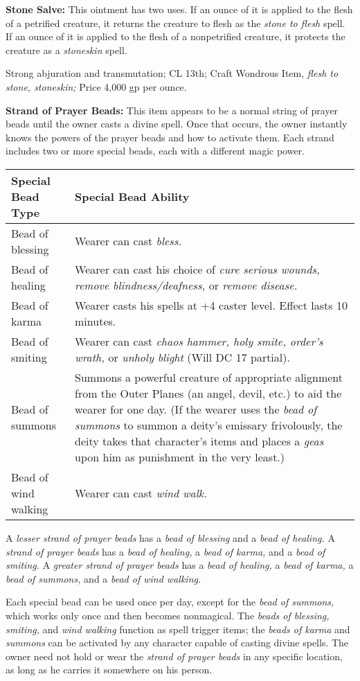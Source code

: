 \documentclass{article}
\begin{document}
\textbf{Stone Salve:} This ointment has two uses. If an ounce of it is applied 
to the flesh of a petrified creature, it returns the creature to flesh as the \textit{stone 
to flesh }spell. If an ounce of it is applied to the flesh of a nonpetrified creature, 
it protects the creature as a \textit{stoneskin }spell.

Strong abjuration and transmutation; CL 13th; Craft Wondrous Item, \textit{flesh 
to stone, stoneskin; }Price 4,000 gp per ounce.

\textbf{Strand of Prayer Beads:} This item appears to be a normal string of prayer 
beads until the owner casts a divine spell. Once that occurs, the owner instantly 
knows the powers of the prayer beads and how to activate them. Each strand includes 
two or more special beads, each with a different magic power.

\begin{tabular}{|>{\raggedright}p{62pt}|>{\raggedright}p{263pt}|}
\hline
S\textbf{pecial Bead Type} & S\textbf{pecial Bead Ability}\tabularnewline
\hline
Bead of blessing & Wearer can cast \textit{bless.}\tabularnewline
\hline
Bead of healing & Wearer can cast his choice of \textit{cure serious wounds, remove 
blindness/deafness, }or \textit{remove disease.}\tabularnewline
\hline
Bead of karma & Wearer casts his spells at +4 caster level. Effect lasts 10 minutes.\tabularnewline
\hline
Bead of smiting & Wearer can cast \textit{chaos hammer, holy smite, order's wrath, 
}or \textit{unholy blight }(Will DC 17 partial).\tabularnewline
\hline
Bead of summons & Summons a powerful creature of appropriate alignment from the 
Outer Planes (an angel, devil, etc.) to aid the wearer for one day. (If the wearer 
uses the \textit{bead of summons }to summon a deity's emissary frivolously, the 
deity takes that character's items and places a \textit{geas }upon him as punishment 
in the very least.)\tabularnewline
\hline
Bead of wind walking & Wearer can cast \textit{wind walk.}\tabularnewline
\hline
\end{tabular}

A \textit{lesser strand of prayer beads }has a \textit{bead of blessing }and a 
\textit{bead of healing. }A \textit{strand of prayer beads }has a \textit{bead 
of healing, }a \textit{bead of karma, }and a \textit{bead of smiting. }A \textit{greater 
strand of prayer beads }has a \textit{bead of healing, }a \textit{bead of karma, 
}a \textit{bead of summons, }and a \textit{bead of wind walking.}

Each special bead can be used once per day, except for the \textit{bead of summons, 
}which works only once and then becomes nonmagical. The \textit{beads of blessing, 
smiting, }and \textit{wind walking }function as spell trigger items; the \textit{beads 
of karma }and \textit{summons }can be activated by any character capable of casting 
divine spells. The owner need not hold or wear the \textit{strand of prayer beads 
}in any specific location, as long as he carries it somewhere on his person.
\end{document}
